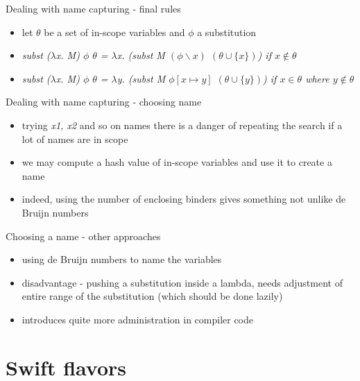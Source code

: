 \documentclass[hyperref={pdfpagelabels=false},xcolor={dvipsnames},compress,table,usenames,dvipsnames]{beamer}
\begin{document}
    \begin{frame}[fragile]{Dealing with name capturing - final rules}
        \begin{itemize}
            \item let $\theta$ be a set of in-scope variables and $\phi$ a substitution\pause
            \item \textit{subst ($\lambda$x. M) $\phi$ $\theta$ = $\lambda$x. (subst M $(\phi\backslash x)$ $(\theta \cup \lbrace x \rbrace)$) if $x\not\in \theta$}\pause
            \item \textit{subst ($\lambda$x. M) $\phi$ $\theta$ = $\lambda$y. (subst M $\phi[x \mapsto y]$ $(\theta \cup \lbrace y \rbrace)$) if $x\in \theta$ where $y\not\in \theta$}
        \end{itemize}
    \end{frame}

    \begin{frame}[fragile]{Dealing with name capturing - choosing name}
        \begin{itemize}
            \item trying \textit{x1, x2} and so on names there is a danger of repeating the search if a lot of names are in scope\pause
            \item we may compute a hash value of in-scope variables and use it to create a name\pause
            \item indeed, using the number of enclosing binders gives something not unlike de Bruijn numbers
        \end{itemize}
    \end{frame}

    \begin{frame}[fragile]{Choosing a name - other approaches}
        \begin{itemize}
            \item using de Bruijn numbers to name the variables\pause
            \item disadvantage - pushing a substitution inside a lambda, needs adjustment of entire range of the substitution (which should be done lazily)\pause
            \item introduces quite more administration in compiler code
        \end{itemize}
    \end{frame}

    \section{Swift flavors}
\end{document}
